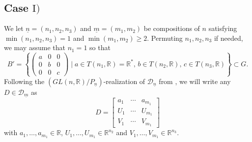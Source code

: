 \documentclass[pdftex]{sigma}
\numberwithin{equation}{section}
\newtheorem{Corollary}[Theorem]{Corollary}
\theoremstyle{definition}
\newcommand{\R}{\mathbb{R}}
\newcommand{\D}{\mathcal{D}}
\newcommand{\T}{T}
\theoremstyle{plain}
\theoremstyle{plain}
\theoremstyle{plain}
\theoremstyle{plain}
\begin{document}
%	
%	
%
%



\subsection[Case I)]{Case $\mathrm{I})$} \label{cas 1}




We let $\underline n = (n_1,n_2,n_3)$ and $\underline m = (m_1,m_2)$ be compositions of $n$ satisfying $\min(n_1,n_2,n_3) = 1$ and $\min(m_1,m_2) \geqslant 2$.
Permuting $n_1,n_2,n_3$ if needed, we may assume that $n_1 = 1$ so that
\begin{equation*}
	B' = \left\{\begin{pmatrix}
			a & 0 & 0 \\
			0 & b & 0 \\
			0 & 0 & c
		\end{pmatrix} \mid a \in \T(n_1,\R) = \R^*, \, b \in \T(n_2,\R), \, c \in \T(n_3,\R)\right\} \subset G.
\end{equation*}
Following the $(GL(n,\R)/P_{\underline n})$-realization of $\D_{\underline n}$ from , we will write any $D \in \D_{\underline m}$ as
\begin{equation*}
	D = \begin{bmatrix}
	a_1 & \cdots & a_{m_1} \\
	U_1 & \cdots & U_{m_1} \\
	V_1 & \cdots & V_{m_1}
\end{bmatrix}
\end{equation*}
with $a_1,\dots,a_{m_1} \in \R$, $U_1,\dots,U_{m_1} \in \R^{n_2}$ and $V_1,\dots,V_{m_1} \in \R^{n_3}$.
\end{document}
